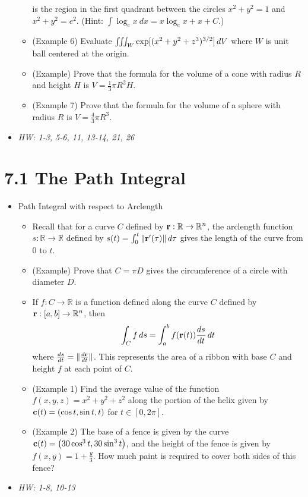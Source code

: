 \documentclass[11pt]{article}
\begin{document}
\begin{itemize}
\begin{itemize}
            is the region in the first quadrant between the circles
            \(x^2+y^2=1\) and \(x^2+y^2=e^2\).
            (Hint: \(\int \log_e x ~dx = x\log_e x + x + C\).)
      \item (Example 6) Evaluate \(\iiint_W\exp[(x^2+y^2+z^3)^{3/2}]\,d V\)
            where \(W\) is unit ball centered at the origin.
      \item (Example) Prove that the formula for the volume of a cone with
            radius \(R\) and height \(H\) is \(V=\frac{1}{3}\pi R^2H\).
      \item (Example 7) Prove that the formula for the volume of a sphere with
            radius \(R\) is \(V=\frac{4}{3}\pi R^3\).
    \end{itemize}
  \item\textit{
    HW: 1-3, 5-6, 11, 13-14, 21, 26
  }
\end{itemize}



\section*{7.1 The Path Integral}

\begin{itemize}
  \item Path Integral with respect to Arclength
    \begin{itemize}
      \item Recall that for a curve \(C\) defined by
            \(\mathbf{r}:\mathbb R\to\mathbb R^n\), the arclength function
            \(s:\mathbb R\to\mathbb R\) defined by
            \(s(t)=\int_0^t\|\mathbf{r}'(\tau)\|\,d\tau\) gives the length
            of the curve from \(0\) to \(t\).
      \item (Example) Prove that \(C=\pi D\) gives the circumference of
            a circle with diameter \(D\).
      \item If \(f:C\to\mathbb R\) is a function defined
            along the curve \(C\) defined by \(\mathbf{r}:[a,b]\to\mathbb R^n\),
            then
            \[
              \int_C f\,d s
                =
              \int_a^b f(\mathbf{r}(t))\frac{ds}{dt}\,d t
            \]
            where \(\frac{ds}{dt}=\|\frac{d\mathbf{r}}{dt}\|\).
            This represents the area of a ribbon with base \(C\) and
            height \(f\) at each point of \(C\).
      \item (Example 1) Find the average value of the function
            \(f(x,y,z)=x^2+y^2+z^2\) along the portion of the helix given by
            \(\mathbf{c}(t)=\left(\cos t,\sin t,t\right)\) for \(t\in[0,2\pi]\).
      \item (Example 2) The base of a fence is given by the curve
            \(\mathbf{c}(t)=\left(30\cos^3t,30\sin^3t\right)\), and the height of the
            fence is given by \(f(x,y)=1+\frac{y}{3}\). How much paint is
            required to cover both sides of this fence?
    \end{itemize}
  \item\textit{
    HW: 1-8, 10-13
  }
\end{itemize}
\end{document}
